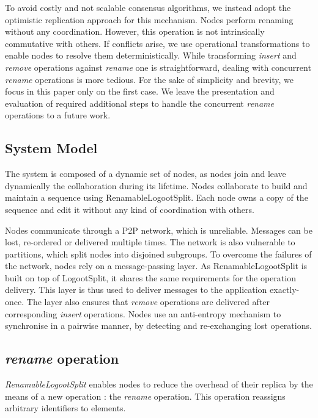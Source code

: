 \documentclass[sigplan,10pt]{acmart}
\begin{document}
To avoid costly and not scalable consensus algorithms, we instead adopt the optimistic replication approach for this mechanism.
Nodes perform renaming without any coordination.
However, this operation is not intrinsically commutative with others.
If conflicts arise, we use operational transformations to enable nodes to resolve them deterministically.
While transforming \emph{insert} and \emph{remove} operations against \emph{rename} one is straightforward, dealing with concurrent \emph{rename} operations is more tedious.
For the sake of simplicity and brevity, we focus in this paper only on the first case.
We leave the presentation and evaluation of required additional steps to handle the concurrent \emph{rename} operations to a future work.

\subsection{System Model}

The system is composed of a dynamic set of nodes, as nodes join and leave dynamically the collaboration during its lifetime.
Nodes collaborate to build and maintain a sequence using RenamableLogootSplit.
Each node owns a copy of the sequence and edit it without any kind of coordination with others.

Nodes communicate through a \ac{P2P} network, which is unreliable.
Messages can be lost, re-ordered or delivered multiple times.
The network is also vulnerable to partitions, which split nodes into disjoined subgroups.
To overcome the failures of the network, nodes rely on a message-passing layer.
As RenamableLogootSplit is built on top of LogootSplit, it shares the same requirements for the operation delivery.
This layer is thus used to deliver messages to the application exactly-once.
The layer also ensures that \emph{remove} operations are delivered after corresponding \emph{insert} operations.
Nodes use an anti-entropy mechanism to synchronise in a pairwise manner, by detecting and re-exchanging lost operations.

\subsection{\emph{rename} operation}

\emph{RenamableLogootSplit} enables nodes to reduce the overhead of their replica by the means of a new operation : the \emph{rename} operation.
This operation reassigns arbitrary identifiers to elements.
\end{document}
